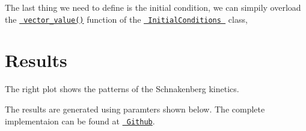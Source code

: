  The last thing we need to define is the initial condition, we can simpily overload the \href{../html/class_initial_conditions.html\#aa10cfdd7350c3810a8deab707f397657}{\texttt{ vector\+\_\+value()}} function of the \href{../html/class_initial_conditions.html}{\texttt{ Initial\+Conditions }} class, 
\begin{DoxyCode}{0}
\DoxyCodeLine{\}}
\end{DoxyCode}
 \hypertarget{growth_results}{}\section{Results}\label{growth_results}
The right plot shows the patterns of the Schnakenberg kinetics.  

The results are generated using paramters shown below. The complete implementaion can be found at \href{https://github.com/mechanoChem/mechanoChemFEM/tree/example/Example1_diffusion_eaction}{\texttt{ Github}}.


